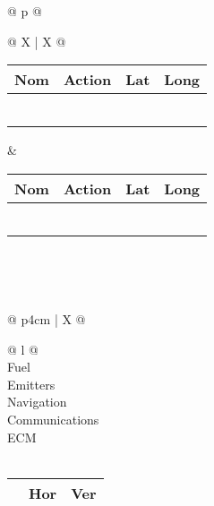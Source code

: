\begin{adjustbox}{width={\textwidth},totalheight={\textheight},keepaspectratio}
{\begin{tabularx}{\textwidth}{ @{} p{\linewidth} @{} }
	\\[-3ex] \midrule
	{\begin{tabularx}{\textwidth}{@{} X | X @{}}
		{\begin{tabularx}{\linewidth}{@{} *{4}X @{}}
			Nom & Action & Lat & Long\\[-3ex] \midrule
			\hfill & \hfill & \hfill & \hfill\\ \midrule
			\hfill & \hfill & \hfill & \hfill\\ \midrule
			\hfill & \hfill & \hfill & \hfill\\ \midrule
			\hfill & \hfill & \hfill & \hfill\\ \midrule
			\hfill & \hfill & \hfill & \hfill\\ \midrule
			\hfill & \hfill & \hfill & \hfill\\
		\end{tabularx}} &
		{\begin{tabularx}{\linewidth}{@{} *{4}X @{}}
			Nom & Action & Lat & Long\\[-3ex] \midrule
			\hfill & \hfill & \hfill & \hfill\\ \midrule
			\hfill & \hfill & \hfill & \hfill\\ \midrule
			\hfill & \hfill & \hfill & \hfill\\ \midrule
			\hfill & \hfill & \hfill & \hfill\\ \midrule
			\hfill & \hfill & \hfill & \hfill\\ \midrule
			\hfill & \hfill & \hfill & \hfill\\
		\end{tabularx}}\\
	\end{tabularx}}\\ \midrule
	{\begin{tabularx}{\textwidth}{@{} p{4cm} | X @{}}
		\begin{tabular}[t]{@{} l @{}}
			\\[-3ex] \midrule
			Fuel\\[-3ex]
			Emitters\\[-3ex]
			Navigation\\[-3ex]
			Communications\\[-3ex]
			ECM\\[-3ex]
			\midrule
			\\[-3ex] \midrule
			{\begin{tabularx}{\linewidth}{@{} r X X @{}}
				& \textbf{Hor} & \textbf{Ver}\\[-3ex] \midrule

\end{tabularx}}
\end{tabular}
\end{tabularx}}
\end{tabularx}}
\end{adjustbox}
